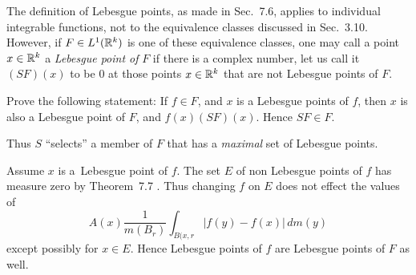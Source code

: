 \begin{enumerate}
\begin{excopy}
The definition of Lebesgue points, as made in Sec.~7.6, applies to individual
integrable functions, not to the equivalence classes discussed in Sec.~3.10.
However, if \(F\in L^1(\mathbb{R}^k)\) is one of these equivalence classes, one may call
a point \(x\in \mathbb{R}^k\)
a \emph{Lebesgue point of}
$F$ if there is a complex number, let us call it \((SF)(x)\) to be $0$
at those points \(x\in \mathbb{R}^k\) that are not Lebesgue points of $F$.

Prove the following statement: If \(f\in F\), and $x$ is a Lebesgue
points of $f$, then $x$ is also a Lebesgue point of $F$, 
and \(f(x)(SF)(x)\).  Hence \(SF\in F\).

Thus $S$ ``selects'' a member of $F$ that has a \emph{maximal} set
of Lebesgue points.
\end{excopy}

Assume $x$ is
a~Lebesgue point of $f$.
The set $E$ of non Lebesgue points of $f$ has measure zero by 
Theorem~7.7 \cite{RudinRCA87}. Thus
changing $f$ on $E$ does not effect the values of 
\begin{equation*}
A(x) \frac{1}{m(B_r)} \int_{B(x,r} |f(y) - f(x)|\,dm(y)
\end{equation*}
except possibly for \(x\in E\).
Hence Lebesgue points of $f$ are Lebesgue points of $F$ as well.

\end{enumerate}
